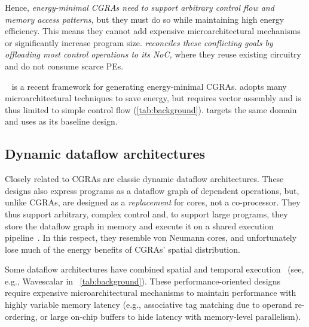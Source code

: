Hence, \emph{energy-minimal CGRAs need to support
arbitrary control flow and memory access patterns,}
%
but they must do so while maintaining high energy efficiency.
%
This means they cannot add expensive microarchitectural mechanisms
or significantly increase program size.
%
\emph{\riptide reconciles these conflicting goals by offloading most control
operations to its NoC,} where they reuse existing circuitry
and do not consume scarce PEs.

\snafu~\cite{snafu} is a recent framework for generating
energy-minimal CGRAs.
%
\snafu adopts many microarchitectural techniques to save energy,
but requires vector assembly and is thus limited to simple control flow (\autoref{tab:background}).
%
\riptide targets the same domain and uses \snafu as its baseline design.


\subsection{Dynamic dataflow architectures}

Closely related to CGRAs are classic dynamic dataflow architectures.
% 
These designs also express programs as a dataflow graph of dependent operations, but, unlike CGRAs, are designed as a \emph{replacement} for cores, not a co-processor.
%
They thus support arbitrary, complex control
%
and, to support large programs, they store the dataflow graph in memory and execute it on a shared execution pipeline~\cite{swanson2003wavescalar,ttda,monsoon,dennis1975preliminary}.
%
In this respect, they resemble von Neumann cores, and unfortunately lose much of the energy benefits of CGRAs' spatial distribution.

Some dataflow architectures have combined spatial and temporal execution~\cite{trips,raw,swanson2003wavescalar,mishra2006tartan,parashar2013triggered,voitsechov2014single,voitsechov2018inter} (see, e.g., Wavescalar in ~\autoref{tab:background}).
%
These performance-oriented designs require expensive microarchitectural mechanisms
to maintain performance with highly variable memory latency
(e.g., associative tag matching due to operand re-ordering, or large on-chip buffers to hide latency with memory-level parallelism).


